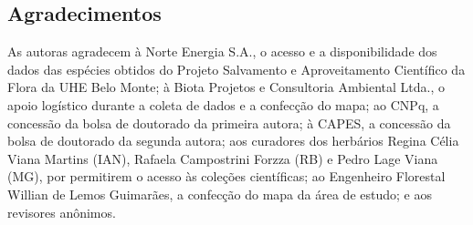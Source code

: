 \begin{multicols}{2}
\section*{Agradecimentos}
\par{}As autoras agradecem à Norte Energia S.\allowbreak{}A.\allowbreak{},\allowbreak{} o acesso e a disponibilidade dos dados das espécies obtidos do Projeto Salvamento e Aproveitamento Científico da Flora da UHE Belo Monte; à Biota Projetos e Consultoria Ambiental Ltda.\allowbreak{},\allowbreak{} o apoio logístico durante a coleta de dados e a confecção do mapa; ao CNPq,\allowbreak{} a concessão da bolsa de doutorado da primeira autora; à CAPES,\allowbreak{} a concessão da bolsa de doutorado da segunda autora; aos curadores dos herbários Regina Célia Viana Martins (\allowbreak{}IAN)\allowbreak{},\allowbreak{} Rafaela Campostrini Forzza (\allowbreak{}RB)\allowbreak{} e Pedro Lage Viana (\allowbreak{}MG)\allowbreak{},\allowbreak{} por permitirem o acesso às coleções científicas; ao Engenheiro Florestal Willian de Lemos Guimarães,\allowbreak{} a confecção do mapa da área de estudo; e aos revisores anônimos.\allowbreak{}
\begin{biblio}[Referências]




\end{biblio}
\end{multicols}
